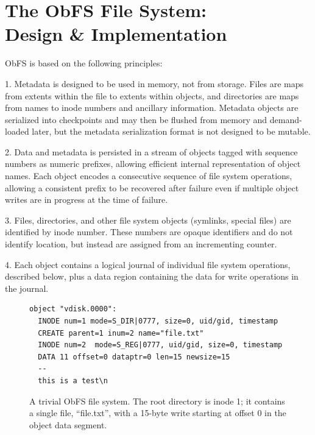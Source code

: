 \section{The ObFS File System:\\ Design \& Implementation}
\label{sec:obfs}
ObFS is based on the following principles:

1. Metadata is designed to be used in memory, not from storage.
Files are maps from extents within the file to extents within objects, and directories are maps from names to inode numbers and ancillary information.
Metadata objects are serialized into checkpoints and may then be flushed from memory and demand-loaded later, but the metadata serialization format is not designed to be mutable.

2. Data and metadata is persisted in a stream of objects tagged with sequence numbers as numeric prefixes, allowing efficient internal representation of object names.
Each object encodes a consecutive sequence of file system operations, allowing a consistent prefix to be recovered after failure even if multiple object writes are in progress at the time of failure.

3. Files, directories, and other file system objects (symlinks, special files) are identified by inode number.
These numbers are opaque identifiers and do not identify location, but instead are assigned from an incrementing counter.

4. Each object contains a logical journal of individual file system operations, described below, plus a data region containing the data for write operations in the journal.

\begin{figure}
\begin{framed}
{\footnotesize 
\begin{verbatim}
object "vdisk.0000":
  INODE num=1 mode=S_DIR|0777, size=0, uid/gid, timestamp
  CREATE parent=1 inum=2 name="file.txt"
  INODE num=2  mode=S_REG|0777, uid/gid, size=0, timestamp
  DATA 11 offset=0 dataptr=0 len=15 newsize=15
  --
  this is a test\n
\end{verbatim} }
\end{framed}

  \caption{ A trivial ObFS file system. \rm The root directory is inode 1; it contains a single file, ``file.txt'', with a 15-byte write starting at offset 0 in the object data segment.} 
  \label{figure:journal1}
\end{figure}

